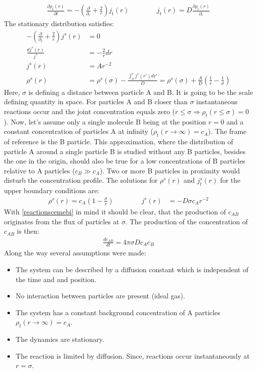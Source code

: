\documentclass[
  a4paper,BCOR10mm,twoside,
  headsepline,footsepline,%
  fleqn,openbib
]{scrbook}
\begin{document}
\begin{align} \label{smoluchwoskionedimension}
\frac{\partial \rho_t(r)}{\partial t}=-\left(\frac{\partial}{\partial_r}+\frac{2}{r} \right) j_t(r) \qquad \qquad j_t(r)=D \frac{\partial\rho_t(r)}{\partial_r}
\end{align}
 The stationary distribution satisfies:
\begin{align}
 -\left(\frac{\partial}{\partial_r}+\frac{2}{r} \right) j^{s}(r)&= 0\\
 \frac{d j^{s}(r)}{j^{s}}  &=- \frac{2}{r} dr\\
 j^{s}(r)&=A r^{-2}\\
 \rho^s(r)&=\rho^s(\sigma)- \frac{\int_{\sigma}^{r} j^{s}(r')dr'}{D}=\rho^s(\sigma)+\frac{A}{D}\left(\frac{1}{r}-\frac{1}{\sigma}\right)
\end{align}
Here, $\sigma$ is defining a distance between particle A and B. It is going to be the scale defining quantity in space. For particles A and B closer than $\sigma$ instantaneous reactions occur and the joint concentration equals zero ($r\leq \sigma \Rightarrow \rho_t(r \leq \sigma)=0$). Now, let's assume only a single molecule B being at the position $r=0$ and a constant concentration of particles A at infinity ($\rho_t(r \rightarrow \infty)=c_A$). The frame of reference is the B particle. This approximation, where the distribution of particle A around a single particle B is studied without any B particles, besides the one in the origin, should also be true for a low concentrations of B particles relative to A particles ($c_B\gg c_A$). Two or more B particles in proximity would disturb the concentration profile. The solutions for $\rho^{s}(r)$ and $j^{s}_t(r)$ for the upper boundary conditions are:
\begin{align}
 \rho^{s}(r)=c_A \left(1-\frac{\sigma}{r}\right) \qquad \qquad j^{s}(r)&=-D \sigma c_A r^{-2}
 \label{smoluchwoskiproblem}
\end{align}
With \cref{reactionscemebi} in mind it should be clear, that the production of $c_{AB}$ originates from the flux of particles at $\sigma$. The production of the concentration of $c_{AB}$ is then: 
\begin{align}
 \frac{d c_{AB} }{dt}=4 \pi \sigma D c_A c_B \label{difkinetics}
\end{align}
Along the way several assumptions were made:
\begin{itemize}
  \item The system can be described by a diffusion constant which is independent of the time and and position. 
  \item No interaction between particles are present (ideal gas).
  \item The system has a constant background concentration of A particles $\rho_t(r \rightarrow \infty)=c_A$.
  \item The dynamics are stationary.
  \item The reaction is limited by diffusion. Since, reactions occur instantaneously at $r=\sigma$. 
\end{itemize}
\end{document}
